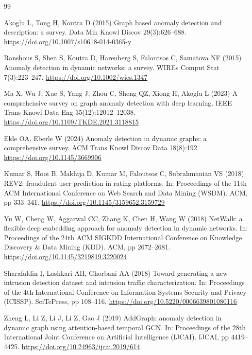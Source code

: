 \documentclass[pdflatex,sn-basic]{sn-jnl}
\theoremstyle{definition}
\theoremstyle{plain}
\begin{document}
\begin{thebibliography}{99}

Akoglu L, Tong H, Koutra D (2015) Graph based anomaly detection and description: a survey. Data Min Knowl Discov 29(3):626--688. \url{https://doi.org/10.1007/s10618-014-0365-y}

Ranshous S, Shen S, Koutra D, Harenberg S, Faloutsos C, Samatova NF (2015) Anomaly detection in dynamic networks: a survey. WIREs Comput Stat 7(3):223--247. \url{https://doi.org/10.1002/wics.1347}

Ma X, Wu J, Xue S, Yang J, Zhou C, Sheng QZ, Xiong H, Akoglu L (2023) A comprehensive survey on graph anomaly detection with deep learning. IEEE Trans Knowl Data Eng 35(12):12012--12038. \url{https://doi.org/10.1109/TKDE.2021.3118815}

Ekle OA, Eberle W (2024) Anomaly detection in dynamic graphs: a comprehensive survey. ACM Trans Knowl Discov Data 18(8):192. \url{https://doi.org/10.1145/3669906}

Kumar S, Hooi B, Makhija D, Kumar M, Faloutsos C, Subrahmanian VS (2018) REV2: fraudulent user prediction in rating platforms. In: Proceedings of the 11th ACM International Conference on Web Search and Data Mining (WSDM). ACM, pp 333--341. \url{https://doi.org/10.1145/3159652.3159729}

Yu W, Cheng W, Aggarwal CC, Zhang K, Chen H, Wang W (2018) NetWalk: a flexible deep embedding approach for anomaly detection in dynamic networks. In: Proceedings of the 24th ACM SIGKDD International Conference on Knowledge Discovery \& Data Mining (KDD). ACM, pp 2672--2681. \url{https://doi.org/10.1145/3219819.3220024}

Sharafaldin I, Lashkari AH, Ghorbani AA (2018) Toward generating a new intrusion detection dataset and intrusion traffic characterization. In: Proceedings of the 4th International Conference on Information Systems Security and Privacy (ICISSP). SciTePress, pp 108--116. \url{https://doi.org/10.5220/0006639801080116}

Zheng L, Li Z, Li J, Li Z, Gao J (2019) AddGraph: anomaly detection in dynamic graph using attention-based temporal GCN. In: Proceedings of the 28th International Joint Conference on Artificial Intelligence (IJCAI). IJCAI, pp 4419--4425. \url{https://doi.org/10.24963/ijcai.2019/614}


\end{thebibliography}
\end{document}
